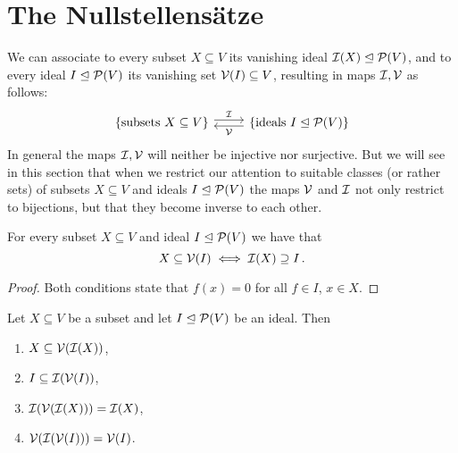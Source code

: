 \section{The Nullstellensätze}


\begin{fluff}
  We can associate to every subset $X \subseteq V$ its vanishing ideal $\mathcal{I}(X) \trianglelefteq \mathcal{P}(V)$, and to every ideal $I \trianglelefteq \mathcal{P}(V)$ its vanishing set $\mathcal{V}(I) \subseteq V$, resulting in maps $\mathcal{I}, \mathcal{V}$ as follows:
  \[
    \begin{tikzcd}
        \{ \text{subsets $X \subseteq V$} \}
        \arrow[shift left]{r}[above]{\mc{I}}
      & \{ \text{ideals $I \idealeq \mc{P}(V)$} \}
        \arrow[shift left]{l}[below]{\mc{V}}
    \end{tikzcd}
  \]
  In general the maps $\mathcal{I}, \mathcal{V}$ will neither be injective nor surjective.
  But we will see in this section that when we restrict our attention to suitable classes (or rather sets) of subsets $X \subseteq V$ and ideals $I \trianglelefteq \mathcal{P}(V)$ the maps $\mathcal{V}$ and $\mathcal{I}$ not only restrict to bijections, but that they become inverse to each other.
\end{fluff}


\begin{lemma}
  \label{lemma: galois connection for vanishing ideals and zero sets}
  For every subset $X \subseteq V$ and ideal $I \trianglelefteq \mathcal{P}(V)$ we have that
  \[
          X \subseteq \mathcal{V}(I)
    \iff  \mathcal{I}(X) \supseteq I \,.
  \]
\end{lemma}


\begin{proof}
  Both conditions state that $f(x) = 0$ for all $f \in I$, $x \in X$.
\end{proof}


\begin{lemma}
  \label{lemma: properties of V and I}
  Let $X \subseteq V$ be a subset and let $I \trianglelefteq \mathcal{P}(V)$ be an ideal.
  Then
  \begin{enumerate}
    \item
      \label{enumerate: VI is monotone}
      $X \subseteq \mathcal{V}(\mathcal{I}(X))$,
    \item
      \label{enumerate: IV is monotone}
      $I \subseteq \mathcal{I}(\mathcal{V}(I))$,
    \item
      \label{enumerate: IVI = I}
      $\mathcal{I}(\mathcal{V}(\mathcal{I}(X))) = \mathcal{I}(X)$,
    \item
      \label{enumerate: VIV = V}
      $\mathcal{V}(\mathcal{I}(\mathcal{V}(I))) = \mathcal{V}(I)$.
  \end{enumerate}
\end{lemma}


